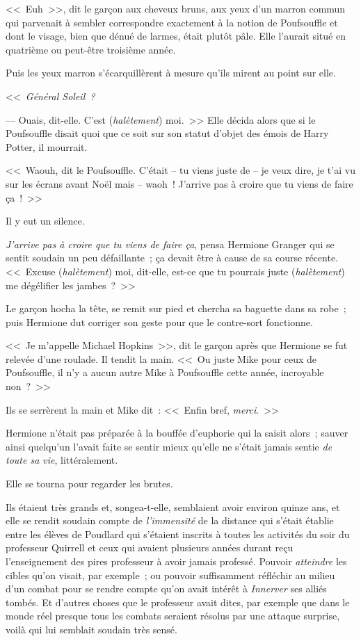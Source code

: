 <<~Euh~>>, dit le garçon aux cheveux bruns, aux yeux d'un marron commun qui parvenait à sembler correspondre exactement à la notion de Poufsouffle et dont le visage, bien que dénué de larmes, était plutôt pâle. Elle l'aurait situé en quatrième ou peut-être troisième année.

Puis les yeux marron s'écarquillèrent à mesure qu'ils mirent au point sur elle.

<<~\emph{Général Soleil~?}

--- Ouais, dit-elle. C'est (\emph{halètement}) moi.~>> Elle décida alors que si le Poufsouffle disait quoi que ce soit sur son statut d'objet des émois de Harry Potter, il mourrait.

<<~Waouh, dit le Poufsouffle. C'était -- tu viens juste de -- je veux dire, je t'ai vu sur les écrans avant Noël mais -- waoh~! J'arrive pas à croire que tu viens de faire ça~!~>>

Il y eut un silence.

\emph{J'arrive pas à croire que tu viens de faire ça}, pensa Hermione Granger qui se sentit soudain un peu défaillante~; ça devait être à cause de sa course récente. <<~Excuse (\emph{halètement}) moi, dit-elle, est-ce que tu pourrais juste (\emph{halètement}) me dégélifier les jambes~?~>>

Le garçon hocha la tête, se remit sur pied et chercha sa baguette dans sa robe~; puis Hermione dut corriger son geste pour que le contre-sort fonctionne.

<<~Je m'appelle Michael Hopkins~>>, dit le garçon après que Hermione se fut relevée d'une roulade. Il tendit la main. <<~Ou juste Mike pour ceux de Poufsouffle, il n'y a aucun autre Mike à Poufsouffle cette année, incroyable non~?~>>

Ils se serrèrent la main et Mike dit~: <<~Enfin bref, \emph{merci}.~>>

Hermione n'était pas préparée à la bouffée d'euphorie qui la saisit alors~; sauver ainsi quelqu'un l'avait faite se sentir mieux qu'elle ne s'était jamais sentie \emph{de toute sa vie}, littéralement.

Elle se tourna pour regarder les brutes.

Ils étaient très grands et, songea-t-elle, semblaient avoir environ quinze ans, et elle se rendit soudain compte de \emph{l'immensité} de la distance qui s'était établie entre les élèves de Poudlard qui s'étaient inscrits à toutes les activités du soir du professeur Quirrell et ceux qui avaient plusieurs années durant reçu l'enseignement des pires professeur à avoir jamais professé. Pouvoir \emph{atteindre} les cibles qu'on visait, par exemple~; ou pouvoir suffisamment réfléchir au milieu d'un combat pour se rendre compte qu'on avait intérêt à \emph{Innerver} ses alliés tombés. Et d'autres choses que le professeur avait dites, par exemple que dans le monde réel presque tous les combats seraient résolus par une attaque surprise, voilà qui lui semblait soudain très sensé.

